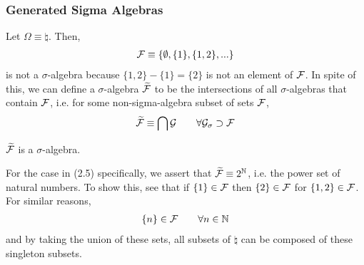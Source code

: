 \subsubsection{Generated Sigma Algebras}
Let $\Omega \equiv \natural$. Then,
\begin{align}
    \mathcal{F} \equiv \{ \emptyset, \{ 1 \}, \{ 1, 2 \}, ... \}
\end{align}
is not a $\sigma$-algebra because $\{ 1, 2 \} - \{ 1 \} = \{ 2 \}$ is not an element of $\mathcal{F}$. In spite of this, we can define a $\sigma$-algebra $\widetilde{\mathcal{F}}$ to be the intersections of all $\sigma$-algebras that contain $\mathcal{F}$, i.e. for some non-sigma-algebra subset of sets $\mathcal{F}$,
\begin{align}
    \widetilde{\curlyf} \equiv \bigcap \mathcal{G} \qsp \forall \mathcal{G}_\sigma \supset \mathcal{F}
\end{align}
\begin{proposition}
    $\widetilde{\mathcal{F}}$ is a $\sigma$-algebra.
\end{proposition}
For the case in (2.5) specifically, we assert that $\widetilde{\mathcal{F}} \equiv 2^{\mathbb{N}}$, i.e. the power set of natural numbers. To show this, see that if $\{ 1 \} \in \mathcal{F}$ then $\{ 2 \} \in \mathcal{F}$ for $\{ 1, 2 \} \in \mathcal{F}$. For similar reasons,
\begin{align}
    \{ n \} \in \curlyf \qsp \forall n \in \natural
\end{align}
and by taking the union of these sets, all subsets of $\natural$ can be composed of these singleton subsets.

